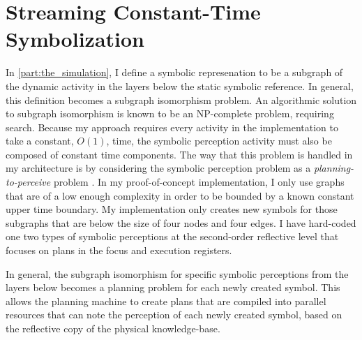\section{Streaming Constant-Time Symbolization}

In {\mbox{\autoref{part:the_simulation}}}, I define a symbolic
represenation to be a subgraph of the dynamic activity in the layers
below the static symbolic reference.  In general, this definition
becomes a subgraph isomorphism problem.  An algorithmic solution to
subgraph isomorphism is known to be an NP-complete problem, requiring
search.  Because my approach requires every activity in the
implementation to take a constant, $O(1)$, time, the symbolic
perception activity must also be composed of constant time components.
The way that this problem is handled in my architecture is by
considering the symbolic perception problem as a
\emph{planning-to-perceive} problem \cite[]{pryorcollins:1995}.  In my
proof-of-concept implementation, I only use graphs that are of a low
enough complexity in order to be bounded by a known constant upper
time boundary.  My implementation only creates new symbols for
those subgraphs that are below the size of four nodes and four edges.
I have hard-coded one two types of symbolic perceptions at the
second-order reflective level that focuses on plans in the focus and
execution registers.

In general, the subgraph isomorphism for specific symbolic perceptions
from the layers below becomes a planning problem for each newly
created symbol.  This allows the planning machine to create plans that
are compiled into parallel resources that can note the perception of
each newly created symbol, based on the reflective copy of the
physical knowledge-base.

